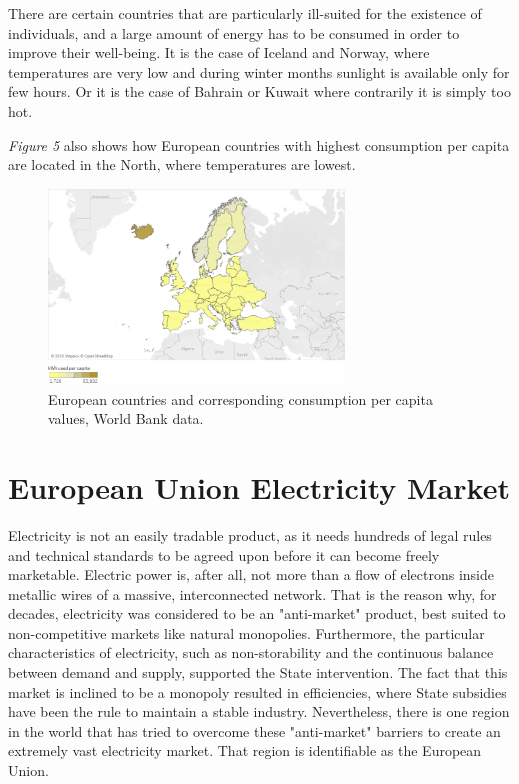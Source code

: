 \documentclass{book}
\begin{document}
There are certain countries that are particularly ill-suited for the existence of individuals, and a large amount of energy has to be consumed in order to improve their well-being. It is the case of Iceland and Norway, where temperatures are very low and during winter months sunlight is available only for few hours. Or it is the case of Bahrain or Kuwait where contrarily it is simply too hot.

\textit{Figure 5} also shows how European countries with highest consumption per capita are located in the North, where temperatures are lowest.

\bigskip
\begin{figure}[H]
\begin{center}
\captionsetup{justification=centering}
\includegraphics[width=0.7\textwidth]{Images/cons.png}
\caption{European countries and corresponding consumption per capita values, World Bank data. }
\end{center}
\end{figure}
\bigskip

\section{European Union Electricity Market}

Electricity is not an easily tradable product, as it needs hundreds of  legal rules and technical standards to be agreed upon before it can become freely marketable. Electric power is, after all, not more than a flow of electrons inside metallic wires of a massive, interconnected network. That is the reason why, for decades, electricity was considered to be an "anti-market" product, best suited to non-competitive markets like natural monopolies. \cite{glachant2014eu} Furthermore, the particular characteristics of electricity, such as non-storability and the continuous balance between demand and supply, supported the State intervention. The fact that this market is inclined to be a monopoly resulted in efficiencies, where State subsidies have been the rule to maintain a stable industry. \cite{domanico2007concentration} Nevertheless, there is one region in the world that has tried to overcome these "anti-market" barriers to create an extremely vast electricity market. That region is identifiable as the European Union. \\
\end{document}
